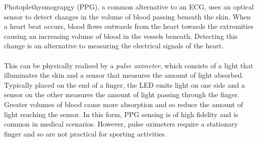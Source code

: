 Photoplethysmograpgy (PPG), a common alternative to an ECG, uses an optical sensor to detect changes in the volume of blood passing beneath the skin.
When a heart beat occurs, blood flows outwards from the heart towards the extremities causing an increasing volume of blood in the vessels beneath.
Detecting this change is an alternative to measuring the electrical signals of the heart.
\\\\
This can be physically realised by a \textit{pulse oximeter}, which consists of a light that illuminates the skin and a sensor that measures the amount of light absorbed. 
Typically placed on the end of a finger, the LED emits light on one side and a sensor on the other measures the amount of light passing through the finger.
Greater volumes of blood cause more absorption and so reduce the amount of light reaching the sensor.
In this form, PPG sensing is of high fidelity and is common in medical scenarios. However, pulse oximeters require a stationary finger and so are not practical for sporting activities.


